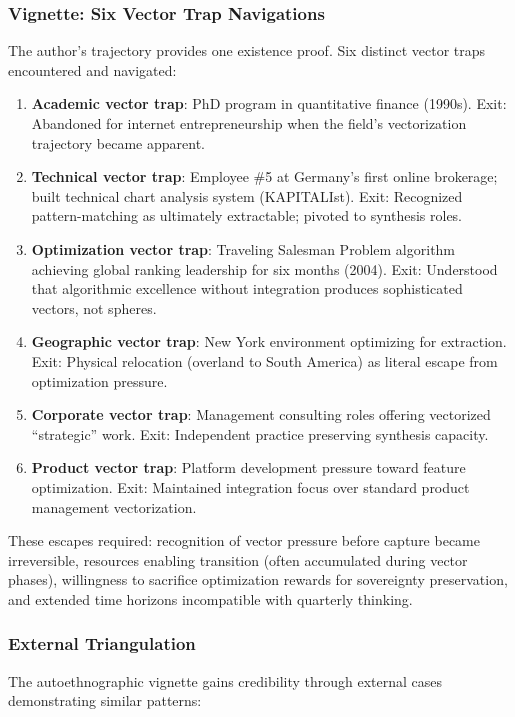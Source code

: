\subsubsection{Vignette: Six Vector Trap Navigations}

The author's trajectory provides one existence proof. Six distinct vector traps encountered and navigated:

\begin{enumerate}
\item \textbf{Academic vector trap}: PhD program in quantitative finance (1990s). Exit: Abandoned for internet entrepreneurship when the field's vectorization trajectory became apparent.
\item \textbf{Technical vector trap}: Employee \#5 at Germany's first online brokerage; built technical chart analysis system (KAPITALIst). Exit: Recognized pattern-matching as ultimately extractable; pivoted to synthesis roles.
\item \textbf{Optimization vector trap}: Traveling Salesman Problem algorithm achieving global ranking leadership for six months (2004). Exit: Understood that algorithmic excellence without integration produces sophisticated vectors, not spheres.
\item \textbf{Geographic vector trap}: New York environment optimizing for extraction. Exit: Physical relocation (overland to South America) as literal escape from optimization pressure.
\item \textbf{Corporate vector trap}: Management consulting roles offering vectorized ``strategic'' work. Exit: Independent practice preserving synthesis capacity.
\item \textbf{Product vector trap}: Platform development pressure toward feature optimization. Exit: Maintained integration focus over standard product management vectorization.
\end{enumerate}

These escapes required: recognition of vector pressure before capture became irreversible, resources enabling transition (often accumulated during vector phases), willingness to sacrifice optimization rewards for sovereignty preservation, and extended time horizons incompatible with quarterly thinking.

\subsubsection{External Triangulation}

The autoethnographic vignette gains credibility through external cases demonstrating similar patterns:

